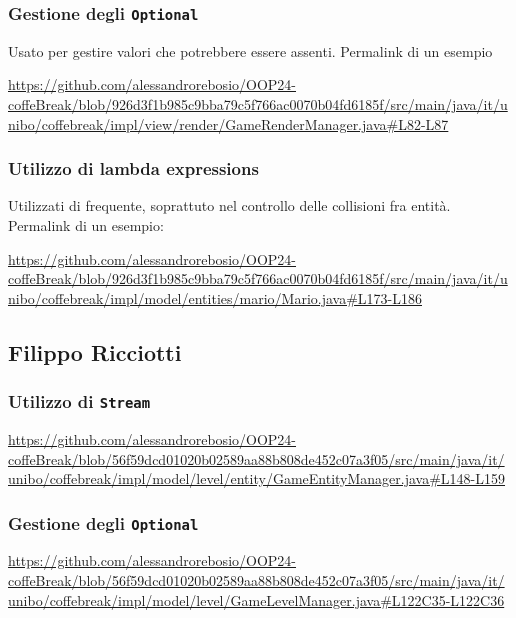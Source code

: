 \documentclass[a4paper,12pt]{report}
\begin{document}
\subsubsection{Gestione degli \texttt{Optional}}
Usato per gestire valori che potrebbere essere assenti. Permalink di un esempio
\begin{sloppypar}
	\raggedright
	\url{https://github.com/alessandrorebosio/OOP24-coffeBreak/blob/926d3f1b985c9bba79c5f766ac0070b04fd6185f/src/main/java/it/unibo/coffebreak/impl/view/render/GameRenderManager.java#L82-L87}
\end{sloppypar}

\subsubsection{Utilizzo di lambda expressions}
Utilizzati di frequente, soprattuto nel controllo delle collisioni fra entità. Permalink di un esempio:
\begin{sloppypar}
	\raggedright
	\url{https://github.com/alessandrorebosio/OOP24-coffeBreak/blob/926d3f1b985c9bba79c5f766ac0070b04fd6185f/src/main/java/it/unibo/coffebreak/impl/model/entities/mario/Mario.java#L173-L186}
\end{sloppypar}

\newpage
\subsection{Filippo Ricciotti}
\subsubsection{Utilizzo di \texttt{Stream}}
\begin{sloppypar}
	\raggedright
	\url{https://github.com/alessandrorebosio/OOP24-coffeBreak/blob/56f59dcd01020b02589aa88b808de452c07a3f05/src/main/java/it/unibo/coffebreak/impl/model/level/entity/GameEntityManager.java#L148-L159}
\end{sloppypar}

\subsubsection{Gestione degli \texttt{Optional}}
\begin{sloppypar}
	\raggedright
	\url{https://github.com/alessandrorebosio/OOP24-coffeBreak/blob/56f59dcd01020b02589aa88b808de452c07a3f05/src/main/java/it/unibo/coffebreak/impl/model/level/GameLevelManager.java#L122C35-L122C36}
\end{sloppypar}
\end{document}

